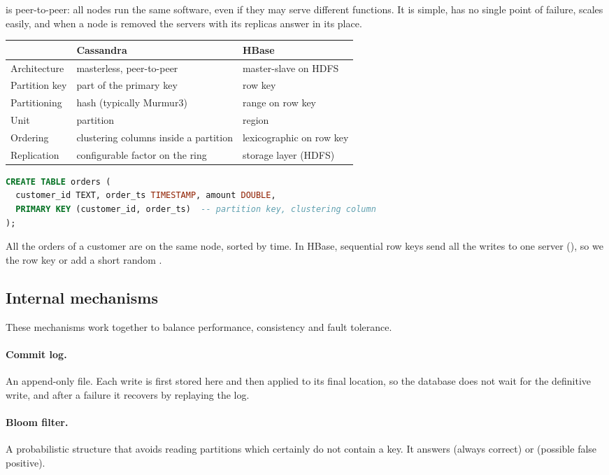  is peer-to-peer: all nodes run the same software, even if they may serve different functions. It is simple, has no single point of failure, scales easily, and when a node is removed the servers with its replicas answer in its place.

\begin{center}\small
\begin{tabular}{p{3.2cm}p{5.4cm}p{5cm}}
\toprule
& \textbf{Cassandra} & \textbf{HBase} \\
\midrule
Architecture & masterless, peer-to-peer & master-slave on HDFS \\
Partition key & part of the primary key & row key \\
Partitioning & hash (typically Murmur3) & range on row key \\
Unit & partition & region \\
Ordering & clustering columns inside a partition & lexicographic on row key \\
Replication & configurable factor on the ring & storage layer (HDFS) \\
\bottomrule
\end{tabular}
\end{center}

\begin{lstlisting}[language=SQL]
CREATE TABLE orders (
  customer_id TEXT, order_ts TIMESTAMP, amount DOUBLE,
  PRIMARY KEY (customer_id, order_ts)  -- partition key, clustering column
);
\end{lstlisting}
All the orders of a customer are on the same node, sorted by time. In HBase, sequential row keys send all the writes to one server (), so we  the row key or add a short random .

\subsection{Internal mechanisms}
These mechanisms work together to balance performance, consistency and fault tolerance.

\paragraph{Commit log.} An append-only file. Each write is first stored here and then applied to its final location, so the database does not wait for the definitive write, and after a failure it recovers by replaying the log.

\paragraph{Bloom filter.} A probabilistic structure that avoids reading partitions which certainly do not contain a key. It answers  (always correct) or  (possible false positive).

